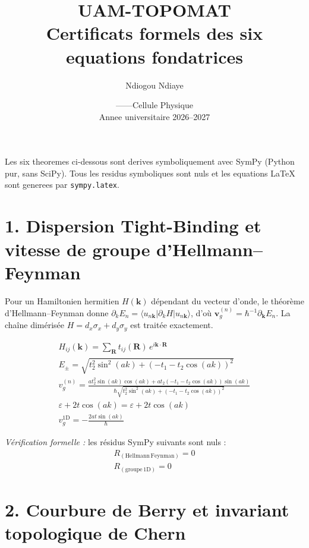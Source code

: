 \documentclass[11pt,a4paper,french]{article}
\title{\textbf{UAM-TOPOMAT}\\[0.4em] \large Certificats formels des six equations fondatrices}
\author{Ndiogou Ndiaye}
\date{\UAM \quad---\quad \UFR \quad---\quad Cellule Physique\\Annee universitaire 2026--2027}
\begin{document}
\maketitle

\begin{tcolorbox}[colback=blue!5,colframe=blue!50!black,title=Certification]
Les six theoremes ci-dessous sont derives symboliquement avec SymPy (Python pur, sans SciPy). Tous les residus symboliques sont nuls et les equations LaTeX sont generees par \texttt{sympy.latex}.
\end{tcolorbox}

\tableofcontents

\section{1. Dispersion Tight-Binding et vitesse de groupe d'Hellmann--Feynman}

Pour un Hamiltonien hermitien $H(\mathbf{k})$ dépendant du vecteur d'onde, le théorème d'Hellmann--Feynman donne $\partial_k E_n=\langle u_{n\mathbf{k}}|\partial_k H|u_{n\mathbf{k}}\rangle$, d'où $\mathbf{v}_g^{(n)}=\hbar^{-1}\partial_{\mathbf{k}}E_n$. La chaîne dimérisée $H=d_x\sigma_x+d_y\sigma_y$ est traitée exactement.

\begin{align}
H_{ij}(\mathbf{k}) = \sum_{\mathbf{R}} t_{ij}(\mathbf{R})\,e^{i\mathbf{k}\cdot\mathbf{R}} \\
E_{\pm} = \sqrt{t_{2}^{2} \sin^{2}{\left(a k \right)} + \left(- t_{1} - t_{2} \cos{\left(a k \right)}\right)^{2}} \\
v_g^{(n)} = \frac{a t_{2}^{2} \sin{\left(a k \right)} \cos{\left(a k \right)} + a t_{2} \left(- t_{1} - t_{2} \cos{\left(a k \right)}\right) \sin{\left(a k \right)}}{\hbar \sqrt{t_{2}^{2} \sin^{2}{\left(a k \right)} + \left(- t_{1} - t_{2} \cos{\left(a k \right)}\right)^{2}}} \\
\varepsilon+2t\cos(ak) = \varepsilon + 2 t \cos{\left(a k \right)} \\
v_g^{\mathrm{1D}} = - \frac{2 a t \sin{\left(a k \right)}}{\hbar}
\end{align}

\noindent\emph{Vérification formelle :} les résidus SymPy suivants sont nuls :
\begin{align}
R_{(\mathrm{Hellmann\, Feynman})} = 0 \\
R_{(\mathrm{groupe\, 1D})} = 0
\end{align}

\section{2. Courbure de Berry et invariant topologique de Chern}
\end{document}
